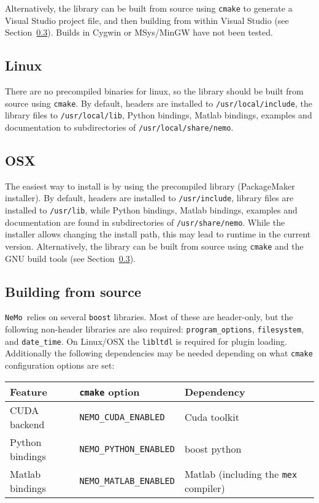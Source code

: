 \documentclass[a4paper]{article}
\newcommand{\nemo}{\texttt{NeMo}}
\newcommand{\command}[1]{\texttt{#1}}
\newcommand{\file}[1]{\texttt{#1}}
\newcommand{\directory}[1]{\texttt{#1}}
\newcommand{\library}[1]{\texttt{#1}}
\begin{document}
Alternatively, the library can be built from source using \command{cmake} to generate a Visual Studio project file,
	and then building from within Visual Studio (see Section~\ref{source_build}).
Builds in Cygwin or MSys/MinGW have not been tested.

\subsection{Linux}

There are no precompiled binaries for linux,
	so the library should be built from source using \command{cmake}.
By default,
	headers are installed to \file{/usr/local/include},
	the library files to \file{/usr/local/lib},
	Python bindings, Matlab bindings, examples and documentation to subdirectories of \directory{/usr/local/share/nemo}.

\subsection{OSX}

The easiest way to install is by using the precompiled library (PackageMaker installer).
By default,
	headers are installed to \directory{/usr/include},
	library files are installed to \directory{/usr/lib},
	while
	Python bindings, Matlab bindings, examples and documentation are found in subdirectories of \directory{/usr/share/nemo}.
While the installer allows changing the install path,
	this may lead to runtime in the current version.
Alternatively, the library can be built from source using \command{cmake} and the GNU build tools (see Section~\ref{source_build}).

\subsection{Building from source}
\label{source_build}

\nemo\ relies on several \library{boost} libraries.
Most of these are header-only, but the following non-header libraries are also required:
	\library{program\_options}, \library{filesystem}, and \library{date\_time}.
On Linux/OSX the \library{libltdl} is required for plugin loading.
Additionally the following dependencies may be needed depending on what \command{cmake} configuration options are set: 

\begin{tabular}{p{}lp{}}
\hline
Feature & \command{cmake} option & Dependency \\
\hline
CUDA backend & \command{NEMO\_CUDA\_ENABLED} & Cuda toolkit \\
Python bindings & \command{NEMO\_PYTHON\_ENABLED} & boost python \\
Matlab bindings & \command{NEMO\_MATLAB\_ENABLED} & Matlab (including the \command{mex} compiler) \\
\hline
\end{tabular}
\end{document}
